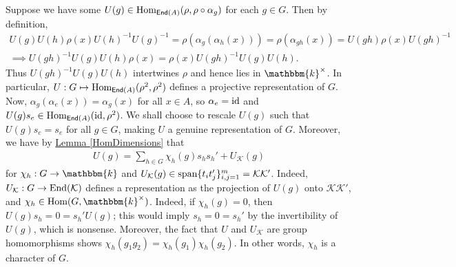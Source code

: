 \noindent Suppose we have some $U(g) \in \textup{Hom}_{\textup{\textsf{End}}(A)}(\rho, \rho \circ \alpha_g)$ for each $g \in G$. Then by definition,
\begin{gather*}
U(g)U(h)\rho(x)U(h)^{-1}U(g)^{-1} = \rho(\alpha_g(\alpha_h(x))) = \rho(\alpha_{gh}(x)) = U(gh)\rho(x)U(gh)^{-1}\\
\implies U(gh)^{-1}U(g)U(h)\rho(x) = \rho(x)U(gh)^{-1}U(g)U(h).
\end{gather*}
\noindent Thus $U(gh)^{-1}U(g)U(h)$ intertwines $\rho$ and hence lies in $\mathbbm{k}^\times$. In particular, $U : G \mapsto \textup{Hom}_{\textup{\textsf{End}}(A)}(\rho^2, \rho^2)$ defines a projective representation of $G$. Now, $\alpha_g(\alpha_e(x)) = \alpha_g(x)$ for all $x \in A$, so $\alpha_e = \textup{id}$ and $U(g)s_e \in \textup{Hom}_{\textup{\textsf{End}}(A)}(\textup{id}, \rho^2)$. We shall choose to rescale $U(g)$ such that $U(g)s_e = s_e$ for all $g \in G$, making $U$ a genuine representation of $G$. Moreover, we have by \hyperref[HomDimensions]{Lemma \ref*{HomDimensions}} that
\begin{align*}
U(g) = \sum_{h \in G}{\chi_h(g)s_hs_h'} + U_\mathcal{K}(g)%
\end{align*}
\noindent for $\chi_h : G \to \mathbbm{k}$ and $U_\mathcal{K}(g) \in \textup{span}\{t_it_j'\}_{i,j = 1}^m = \mathcal{K}\mathcal{K}'$. Indeed, $U_\mathcal{K} : G \to \textup{End}(\mathcal{K})$ defines a representation as the projection of $U(g)$ onto $\mathcal{K}\mathcal{K}'$, and $\chi_h \in \homset(G, \mathbbm{k}^\times)$. Indeed, if $\chi_h(g) = 0$, then $U(g)s_h = 0 = s_h'U(g)$; this would imply $s_h = 0 = s_h'$ by the invertibility of $U(g)$, which is nonsense. Moreover, the fact that $U$ and $U_\mathcal{K}$ are group homomorphisms shows $\chi_h(g_1g_2) = \chi_h(g_1)\chi_h(g_2)$.
 In other words, $\chi_h$ is a character of $G$.\\


